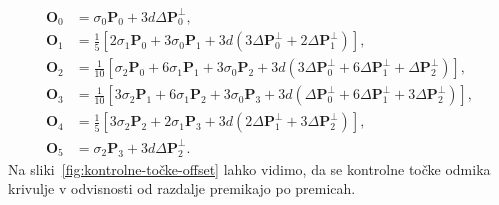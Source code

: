 \documentclass[isrm2, tisk]{fmfdelo}
\newcommand{\mycomment}[1]{\textbf{\textcolor{red}{#1}}}
\begin{document}
    \begin{align*}
        \mathbf{O}_0 &= \sigma_0\mathbf{P}_0+3d\Delta\mathbf{P}_0^{\perp},  \\
        \mathbf{O}_1 &= \frac{1}{5} \left[ 2\sigma_1\mathbf{P}_0+ 3\sigma_0\mathbf{P}_1 + 3d(3\Delta\mathbf{P}_0^{\perp} + 2\Delta\mathbf{P}_1^{\perp})\right], \\
        \mathbf{O}_2 &= \frac{1}{10} \left[\sigma_2\mathbf{P}_0+ 6\sigma_1\mathbf{P}_1 + 3\sigma_0\mathbf{P}_2 + 3d(3\Delta\mathbf{P}_0^{\perp} + 6\Delta\mathbf{P}_1^{\perp}+\Delta\mathbf{P}_2^{\perp})\right], \\
        \mathbf{O}_3 &= \frac{1}{10} \left[3\sigma_2\mathbf{P}_1+ 6\sigma_1\mathbf{P}_2 + 3\sigma_0\mathbf{P}_3 + 3d(\Delta\mathbf{P}_0^{\perp} + 6\Delta\mathbf{P}_1^{\perp}+3\Delta\mathbf{P}_2^{\perp})\right], \\
        \mathbf{O}_4 &= \frac{1}{5} \left[3\sigma_2\mathbf{P}_2+ 2\sigma_1\mathbf{P}_3 + 3d(2\Delta\mathbf{P}_1^{\perp} + 3\Delta\mathbf{P}_2^{\perp})\right], \\
        \mathbf{O}_5 &= \sigma_2\mathbf{P}_3+3d\Delta\mathbf{P}_2^{\perp}.
    \end{align*}
    Na sliki~\ref{fig:kontrolne-točke-offset} lahko vidimo, da se kontrolne točke odmika krivulje v odvisnosti od razdalje premikajo po premicah.
\end{document}
